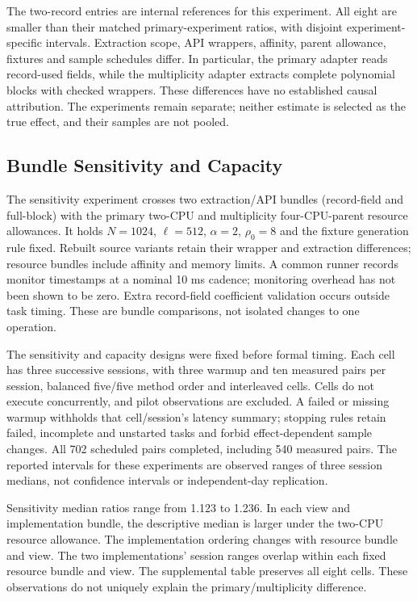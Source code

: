 The two-record entries are internal references for this experiment.
All eight are smaller than their matched primary-experiment ratios, with
disjoint experiment-specific intervals. Extraction scope, API wrappers,
affinity, parent allowance, fixtures and sample schedules differ. In
particular, the primary adapter reads record-used fields, while the
multiplicity adapter extracts complete polynomial blocks with checked
wrappers. These differences have no established causal attribution. The
experiments remain separate; neither estimate is selected as the true
effect, and their samples are not pooled.


\subsection{Bundle Sensitivity and Capacity}
\label{sec:capacity-evaluation}
The sensitivity experiment crosses two extraction/API bundles
(record-field and full-block) with the primary two-CPU and multiplicity
four-CPU-parent resource allowances. It holds \(N=1024\), \(\ell=512\),
\(\alpha=2\), \(\rho_0=8\) and the fixture generation rule fixed. Rebuilt
source variants retain their wrapper and extraction differences; resource
bundles include affinity and memory limits. A common runner records
monitor timestamps at a nominal 10 ms cadence; monitoring overhead has
not been shown to be zero. Extra record-field
coefficient validation occurs outside task timing. These are bundle
comparisons, not isolated changes to one operation.

The sensitivity and capacity designs were fixed before formal timing.
Each cell has three successive sessions, with three warmup and ten
measured pairs per session, balanced five/five method order and
interleaved cells. Cells do not execute concurrently, and pilot observations
are excluded. A failed or missing warmup
withholds that cell/session's latency summary; stopping rules retain
failed, incomplete and unstarted tasks and forbid effect-dependent sample
changes. All 702 scheduled pairs completed, including 540 measured pairs.
The reported intervals for these experiments are observed ranges of
three session medians, not confidence intervals or independent-day
replication.

Sensitivity median ratios range from 1.123 to 1.236. In each view and
implementation bundle, the descriptive median is larger under the
two-CPU resource allowance. The implementation ordering changes with
resource bundle and view. The two implementations' session ranges overlap
within each fixed resource bundle and view. The supplemental
table preserves all eight cells. These observations do not uniquely
explain the primary/multiplicity difference.

